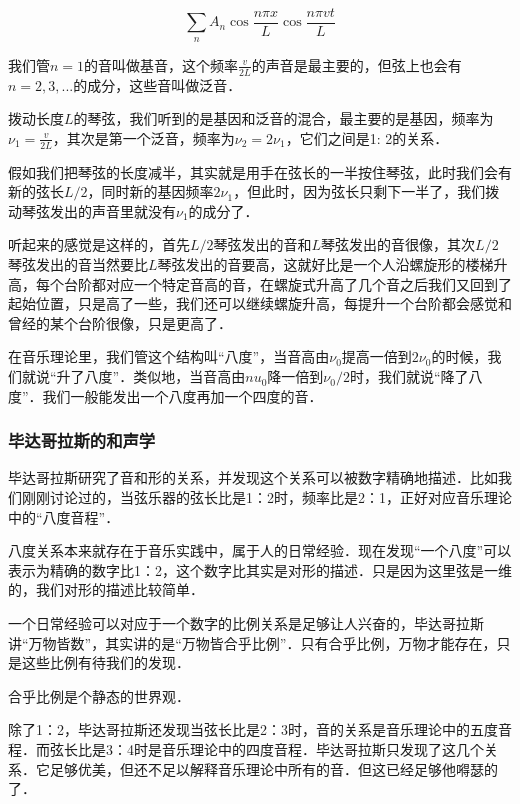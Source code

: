 \begin{equation}
\sum\limits_{n} A_n \cos \frac{n \pi x}{L} \cos \frac{n \pi vt}{L}
\end{equation}

我们管$n = 1$的音叫做基音，这个频率$\frac{v}{2L}$的声音是最主要的，但弦上也会有$n= 2, 3, ...$的成分，这些音叫做泛音．

拨动长度$L$的琴弦，我们听到的是基因和泛音的混合，最主要的是基因，频率为$\nu_1 = \frac{v}{2L} $，其次是第一个泛音，频率为$\nu_2 = 2 \nu_1$，它们之间是1: 2的关系．

假如我们把琴弦的长度减半，其实就是用手在弦长的一半按住琴弦，此时我们会有新的弦长$L/2$，同时新的基因频率$2 \nu_1$，但此时，因为弦长只剩下一半了，我们拨动琴弦发出的声音里就没有$\nu_1$的成分了．

听起来的感觉是这样的，首先$L/2$琴弦发出的音和$L$琴弦发出的音很像，其次$L/2$琴弦发出的音当然要比$L$琴弦发出的音要高，这就好比是一个人沿螺旋形的楼梯升高，每个台阶都对应一个特定音高的音，在螺旋式升高了几个音之后我们又回到了起始位置，只是高了一些，我们还可以继续螺旋升高，每提升一个台阶都会感觉和曾经的某个台阶很像，只是更高了．

在音乐理论里，我们管这个结构叫“八度”，当音高由$\nu_0$提高一倍到$2 \nu_0$的时候，我们就说“升了八度”．类似地，当音高由$nu_0$降一倍到$\nu_0 /2$时，我们就说“降了八度”．我们一般能发出一个八度再加一个四度的音．

\subsubsection{毕达哥拉斯的和声学}

毕达哥拉斯研究了音和形的关系，并发现这个关系可以被数字精确地描述．比如我们刚刚讨论过的，当弦乐器的弦长比是1：2时，频率比是2：1，正好对应音乐理论中的“八度音程”．

八度关系本来就存在于音乐实践中，属于人的日常经验．现在发现“一个八度”可以表示为精确的数字比1：2，这个数字比其实是对形的描述．只是因为这里弦是一维的，我们对形的描述比较简单．

一个日常经验可以对应于一个数字的比例关系是足够让人兴奋的，毕达哥拉斯讲“万物皆数”，其实讲的是“万物皆合乎比例”．只有合乎比例，万物才能存在，只是这些比例有待我们的发现．

合乎比例是个静态的世界观．

除了1：2，毕达哥拉斯还发现当弦长比是2：3时，音的关系是音乐理论中的五度音程．而弦长比是3：4时是音乐理论中的四度音程．毕达哥拉斯只发现了这几个关系．它足够优美，但还不足以解释音乐理论中所有的音．但这已经足够他嘚瑟的了．

